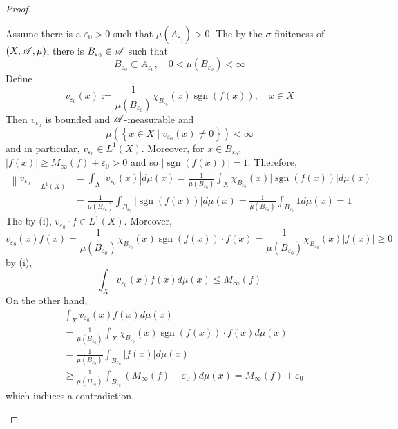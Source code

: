 \begin{proof}
\begin{enumerate}[label=(\roman*)]
		\noindent Assume there is a $\varepsilon_0 > 0$ such that $\mu(A_{\varepsilon_)}) > 0$. The by the $\sigma$-finiteness of $(X,\mathscr{A},\mu)$, there is $B_{\varepsilon_0} \in \mathscr{A}$ such that
		\begin{equation*}
			B_{\varepsilon_0} \subset A_{\varepsilon_0}, \quad 0<\mu\left(B_{\varepsilon_0}\right)<\infty
		\end{equation*}
		Define
		\begin{equation*}
			v_{\varepsilon_0}(x):=\frac{1}{\mu\left(B_{\varepsilon_0}\right)} \chi_{B_{\varepsilon_0}}(x) \operatorname{sgn}(f(x)),\quad x \in X
		\end{equation*}
		Then $v_{\varepsilon_0}$ is bounded and $\mathscr{A}$-measurable and
		\begin{equation*}
			\mu\left(\left\{x \in X \mid v_{\varepsilon_0}(x) \neq 0\right\}\right)<\infty
		\end{equation*}
		and in particular, $v_{\varepsilon_0} \in L^1(X)$. Moreover, for $x \in B_{\varepsilon_0}$, $|f(x)| \geq M_{\infty}(f)+\varepsilon_0 > 0$ and so $|\operatorname{sgn}(f(x))|=1$. Therefore,
		\begin{equation*}
			\begin{aligned}
				\left\|v_{\varepsilon_0}\right\|_{L^1(X)} & =\int_X\left|v_{\varepsilon_0}(x)\right| d \mu(x)=\frac{1}{\mu\left(B_{\varepsilon_0}\right)} \int_X \chi_{B_{\varepsilon_0}}(x)|\operatorname{sgn}(f(x))| d \mu(x) \\
				& =\frac{1}{\mu\left(B_{\varepsilon_0}\right)} \int_{B_{\varepsilon_0}}|\operatorname{sgn}(f(x))| d \mu(x)=\frac{1}{\mu\left(B_{\varepsilon_0}\right)} \int_{B_{\varepsilon_0}} 1 d \mu(x)=1
			\end{aligned}
		\end{equation*}
		The by (i), $v_{\varepsilon_0} \cdot f \in L^1(X)$. Moreover,
		\begin{equation*}
			v_{\varepsilon_0}(x) f(x)=\frac{1}{\mu\left(B_{\varepsilon_0}\right)} \chi_{B_{\varepsilon_0}}(x) \operatorname{sgn}(f(x)) \cdot f(x)=\frac{1}{\mu\left(B_{\varepsilon_0}\right)} \chi_{B_{\varepsilon_0}}(x)|f(x)| \geq 0
		\end{equation*}
		by (i),
		\begin{equation*}
			\int_X v_{\varepsilon_0}(x) f(x) d \mu(x) \leq M_{\infty}(f)
		\end{equation*}
		On the other hand,
		\begin{equation*}
			\begin{aligned}
				& \int_X v_{\varepsilon_0}(x) f(x) d \mu(x) \\
				& =\frac{1}{\mu\left(B_{\varepsilon_0}\right)} \int_X \chi_{B_{\varepsilon_0}}(x) \operatorname{sgn}(f(x)) \cdot f(x) d \mu(x) \\
				& =\frac{1}{\mu\left(B_{\varepsilon_0}\right)} \int_{B_{\varepsilon_0}}|f(x)| d \mu(x) \\
				& \geq \frac{1}{\mu\left(B_{\varepsilon_0}\right)} \int_{B_{\varepsilon_0}}\left(M_{\infty}(f)+\varepsilon_0\right) d \mu(x)=M_{\infty}(f)+\varepsilon_0
			\end{aligned}
		\end{equation*}
		which induces a contradiction. 


\end{enumerate}
\end{proof}
